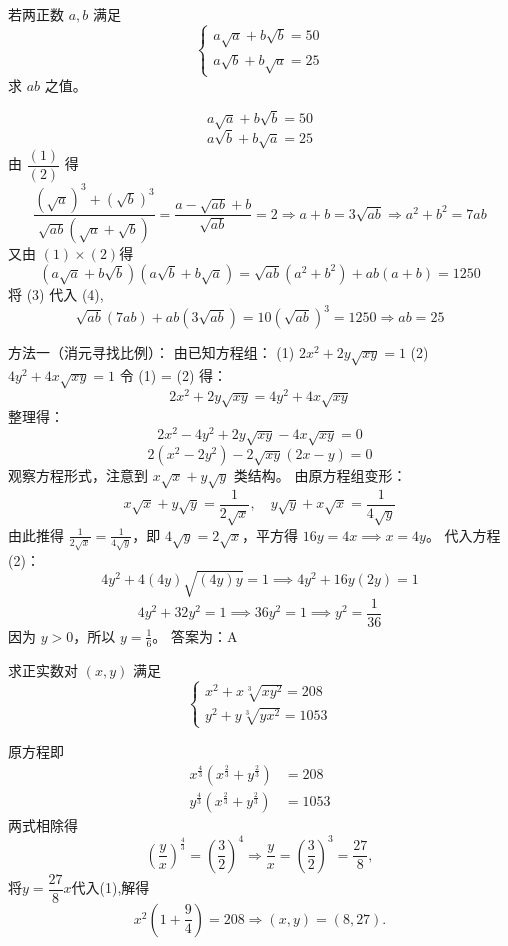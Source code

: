 \begin{questions}
    \question 若两正数 $a,b$ 满足
    \[
    \begin{cases}
    a\sqrt{a} + b\sqrt{b} = 50 \\
    a\sqrt{b} + b\sqrt{a} = 25
    \end{cases}
    \]
    求 $ab$ 之值。
    \begin{solution}
        \[
        a\sqrt{a} + b\sqrt{b} = 50 \tag{1}
        \]
        \[
        a\sqrt{b} + b\sqrt{a} = 25 \tag{2}
        \]
        由 $\dfrac{(1)}{(2)}$ 得
        \[
        \frac{(\sqrt{a})^3 + (\sqrt{b})^3}{\sqrt{ab}(\sqrt{a}+\sqrt{b})}
        = \frac{a - \sqrt{ab} + b}{\sqrt{ab}} = 2 \Rightarrow a + b = 3\sqrt{ab} \Rightarrow a^2 + b^2 = 7ab \tag{3}
        \]
        又由 $(1)\times(2)$得
        \[
        (a\sqrt{a} + b\sqrt{b})(a\sqrt{b} + b\sqrt{a})
        = \sqrt{ab}(a^2+b^2) + ab(a+b) = 1250 \tag{4}
        \]
        将 (3) 代入 (4),
        \[
        \sqrt{ab}(7ab) + ab(3\sqrt{ab}) =10(\sqrt{ab})^3= 1250 \Rightarrow ab = 25
        \]
    \end{solution}

    \begin{solution}
方法一（消元寻找比例）：
由已知方程组：
(1) $2x^2 + 2y\sqrt{xy} = 1$
(2) $4y^2 + 4x\sqrt{xy} = 1$
令 (1) = (2) 得：
\[
2x^2 + 2y\sqrt{xy} = 4y^2 + 4x\sqrt{xy}
\]
整理得：
\[
2x^2 - 4y^2 + 2y\sqrt{xy} - 4x\sqrt{xy} = 0
\]
\[
2(x^2 - 2y^2) - 2\sqrt{xy}(2x - y) = 0
\]
观察方程形式，注意到 $x\sqrt{x} + y\sqrt{y}$ 类结构。
由原方程组变形：
\[
x\sqrt{x} + y\sqrt{y} = \frac{1}{2\sqrt{x}}, \quad y\sqrt{y} + x\sqrt{x} = \frac{1}{4\sqrt{y}}
\]
由此推得 $\frac{1}{2\sqrt{x}} = \frac{1}{4\sqrt{y}}$，即 $4\sqrt{y} = 2\sqrt{x}$，平方得 $16y = 4x \implies x = 4y$。
代入方程 (2)：
\[
4y^2 + 4(4y)\sqrt{(4y)y} = 1 \implies 4y^2 + 16y(2y) = 1
\]
\[
4y^2 + 32y^2 = 1 \implies 36y^2 = 1 \implies y^2 = \frac{1}{36}
\]
因为 $y > 0$，所以 $y = \frac{1}{6}$。
答案为：A
\end{solution}

    \question 求正实数对 $(x,y)$ 满足
    \[
    \begin{cases}
    x^{2}+x\sqrt[3]{xy^{2}}=208 \\
    y^{2}+y\sqrt[3]{yx^{2}}=1053
    \end{cases}
    \]
    \begin{solution}
        原方程即
        \begin{align}
        x^{\frac{4}{3}}(x^{\frac{2}{3}}+y^{\frac{2}{3}})&=208 \\
        y^{\frac{4}{3}}(x^{\frac{2}{3}}+y^{\frac{2}{3}})&=1053
        \end{align}
        两式相除得
        \[
        \left(\frac{y}{x}\right)^{\frac{4}{3}}=\left(\frac{3}{2}\right)^{4} \Rightarrow \frac{y}{x}=\left(\frac{3}{2}\right)^{3}=\frac{27}{8},
        \]
        将$y=\dfrac{27}{8}x$代入(1),解得
        \[
        x^2\left(1+\frac{9}{4}\right)=208 \Rightarrow (x,y)=(8,27).
        \]
    \end{solution}


\end{questions}
